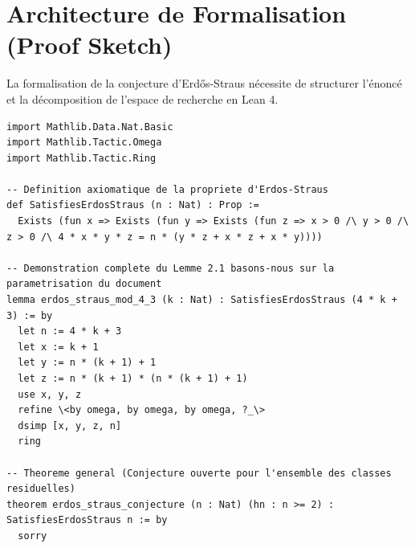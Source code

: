 \documentclass[12pt, a4paper]{article}
\begin{document}
\section{Architecture de Formalisation (Proof Sketch)}
La formalisation de la conjecture d'Erdős-Straus nécessite de structurer l'énoncé et la décomposition de l'espace de recherche en Lean 4.
\begin{lstlisting}[language=lean, basicstyle=\ttfamily\small, breaklines=true]
import Mathlib.Data.Nat.Basic
import Mathlib.Tactic.Omega
import Mathlib.Tactic.Ring

-- Definition axiomatique de la propriete d'Erdos-Straus
def SatisfiesErdosStraus (n : Nat) : Prop :=
  Exists (fun x => Exists (fun y => Exists (fun z => x > 0 /\ y > 0 /\ z > 0 /\ 4 * x * y * z = n * (y * z + x * z + x * y))))

-- Demonstration complete du Lemme 2.1 basons-nous sur la parametrisation du document
lemma erdos_straus_mod_4_3 (k : Nat) : SatisfiesErdosStraus (4 * k + 3) := by
  let n := 4 * k + 3
  let x := k + 1
  let y := n * (k + 1) + 1
  let z := n * (k + 1) * (n * (k + 1) + 1)
  use x, y, z
  refine \<by omega, by omega, by omega, ?_\>
  dsimp [x, y, z, n]
  ring

-- Theoreme general (Conjecture ouverte pour l'ensemble des classes residuelles)
theorem erdos_straus_conjecture (n : Nat) (hn : n >= 2) : SatisfiesErdosStraus n := by
  sorry
\end{lstlisting}
\end{document}
